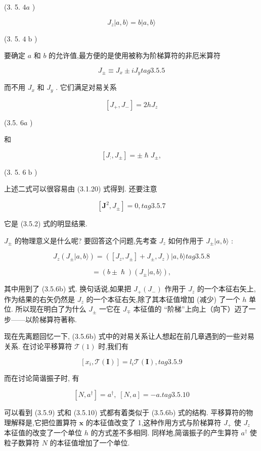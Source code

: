 (3. 5. ${4a}$ )

$$
{J}_{z}\left| {a, b\rangle = b}\right| a, b\rangle
$$

(3. 5. $4\mathrm{\;b}$ )

要确定 $a$ 和 $b$ 的允许值,最方便的是使用被称为阶梯算符的非厄米算符

$$
{J}_{ \pm } \equiv {J}_{x} \pm i{J}_{y} tag{3.5.5}
$$

而不用 ${J}_{x}$ 和 ${J}_{y}$ . 它们满足对易关系

$$
\left\lbrack {{J}_{ + },{J}_{ - }}\right\rbrack = {2h}{J}_{z}
$$

(3.5. ${6a}$ )

和

$$
\left\lbrack {{J}_{ : },{J}_{ \pm }}\right\rbrack = \pm \hslash {J}_{ \pm },
$$

(3. 5. $6\mathrm{\;b}$ )

上述二式可以很容易由 (3.1.20) 式得到. 还要注意

$$
\left\lbrack {{\mathbf{J}}^{2},{J}_{ \pm }}\right\rbrack = 0, tag{3.5.7}
$$

它是 (3.5.2) 式的明显结果.

${J}_{ \pm }$ 的物理意义是什么呢? 要回答这个问题,先考查 ${J}_{z}$ 如何作用于 ${J}_{ \pm }|a, b\rangle$ :

$$
{J}_{z}\left( {{J}_{ \pm }|a, b\rangle }\right) = \left( {\left\lbrack {{J}_{z},{J}_{ \pm }}\right\rbrack + {J}_{ \pm },{J}_{z}}\right) |a, b\rangle tag{3.5.8}
$$

$$
= \left( {b \pm \hslash }\right) \left( {{J}_{ \pm }|a, b\rangle }\right) ,
$$

其中用到了 (3.5.6b) 式. 换句话说,如果把 ${J}_{ + }\left( {J}_{ - }\right)$ 作用于 ${J}_{z}$ 的一个本征右矢上,作为结果的右矢仍然是 ${J}_{z}$ 的一个本征右矢,除了其本征值增加 (减少) 了一个 $h$ 单位. 所以现在明白了为什么 ${J}_{ \pm }$ 一它在 ${J}_{ \mp }$ 本征值的 “阶梯”上向上（向下）迈了一步——以阶梯算符著称.

现在先离题回忆一下, (3.5.6b) 式中的对易关系让人想起在前几章遇到的一些对易关系. 在讨论平移算符 $\mathcal{T}\left( 1\right)$ 时,我们有

$$
\left\lbrack {{x}_{i},\mathcal{T}\left( \mathbf{I}\right) }\right\rbrack = {l}_{i}\mathcal{T}\left( \mathbf{I}\right) , tag{3.5.9}
$$

而在讨论简谐振子时, 有

$$
\left\lbrack {N,{a}^{ \dagger }}\right\rbrack = {a}^{ \dagger },\;\left\lbrack {N, a}\right\rbrack = - a. tag{3. 5.10}
$$

可以看到 (3.5.9) 式和 (3.5.10) 式都有着类似于 (3.5.6b) 式的结构. 平移算符的物理解释是,它把位置算符 $\mathbf{x}$ 的本征值改变了 1,这种作用方式与阶梯算符 ${J}_{ + }$ 使 ${J}_{z}$ 本征值的改变了一个单位 $h$ 的方式差不多相同. 同样地,简谐振子的产生算符 ${a}^{ \dagger }$ 使粒子数算符 $N$ 的本征值增加了一个单位.

